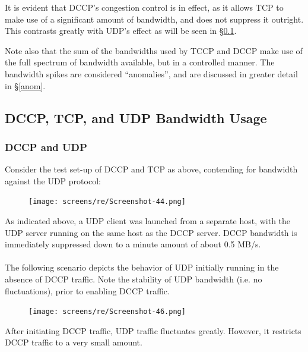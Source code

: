 \documentclass[10pt,a4paper]{article}
\begin{document}
It is evident that DCCP's congestion control is in effect, as it allows TCP to
make use of a significant amount of bandwidth, and does not suppress it
outright. This contrasts greatly with UDP's effect as will be seen in
\S\ref{contention}.


Note also that the sum of the bandwidths used by TCCP and DCCP make use of the full spectrum of bandwidth available,
but in a controlled manner. The bandwidth spikes are considered ``anomalies'',
and are discussed in greater detail in \S\ref{anom}.


\subsection{DCCP, TCP, and UDP Bandwidth Usage}

\label{contention}
\subsubsection{DCCP and UDP}
Consider the test set-up of DCCP and TCP as above, contending for bandwidth against the UDP
protocol:

\begin{figure}[!h]
\begin{center}
\hspace*{-65pt}
\texttt{[image: screens/re/Screenshot-44.png]}
\end{center}
\end{figure}

As indicated above, a UDP client was launched from a separate host, with the
UDP server running on the same host as the DCCP server. DCCP bandwidth
is immediately suppressed down to a minute amount of about
0.5 MB/s. 
\paragraph{}
The following scenario depicts the behavior of UDP initially running in the absence of DCCP traffic.
Note the stability of UDP bandwidth (i.e. no fluctuations), 
prior to enabling DCCP traffic.

\begin{figure}[!h]
\begin{center}
\hspace*{-65pt}
\texttt{[image: screens/re/Screenshot-46.png]}
\end{center}
\end{figure}

After initiating DCCP traffic, UDP traffic fluctuates greatly. However, it restricts DCCP
traffic to a very small amount.
\end{document}
